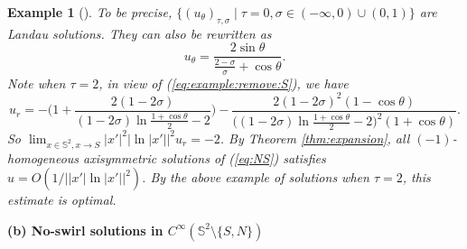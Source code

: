 \documentclass[12pt]{article}
\newtheorem{example}{Example}[section]
\begin{document}
\begin{example}[\cite{LLY1}]
	To be precise, $\{(u_{\theta})_{\tau,\sigma} \mid \tau=0, \sigma\in (-\infty,0)\cup (0,1)\}$ are Landau solutions. They can also be rewritten as 
	\[
		u_{\theta}=\frac{2\sin\theta}{\frac{2-\sigma}{\sigma}+\cos\theta}. 
	\]
	Note when $\tau=2$, in view of (\ref{eq:example:remove:S}), we have 
	\[
		u_r = - \Bigg( 1+ \frac{ 2 ( 1 - 2 \sigma) }{ \displaystyle ( 1 - 2 \sigma) \ln \frac{ 1 + \cos \theta }{2} - 2 } \Bigg) - \frac{ 2 ( 1 - 2 \sigma )^2( 1 - \cos \theta ) }{ \Big( \displaystyle ( 1 - 2 \sigma ) \ln \frac{ 1 + \cos \theta }{2} - 2 \Big)^2 ( 1 + \cos \theta ) }. 
	\]
	So $\lim_{x\in \mathbb{S}^2, x\to S} |x'|^2 \big| \ln |x'| \big|^2 u_r = - 2$. By Theorem \ref{thm:expansion}, all $(-1)$-homogeneous axisymmetric solutions of (\ref{eq:NS}) satisfies $u=O(1/\big| |x'| \ln |x'| \big|^2)$. By the above example of solutions when $\tau=2$, this estimate is optimal.
\end{example}

\medskip

\noindent\textbf{(b) No-swirl solutions in $C^{\infty}(\mathbb{S}^2\setminus\{S, N\})$}
\end{document}
